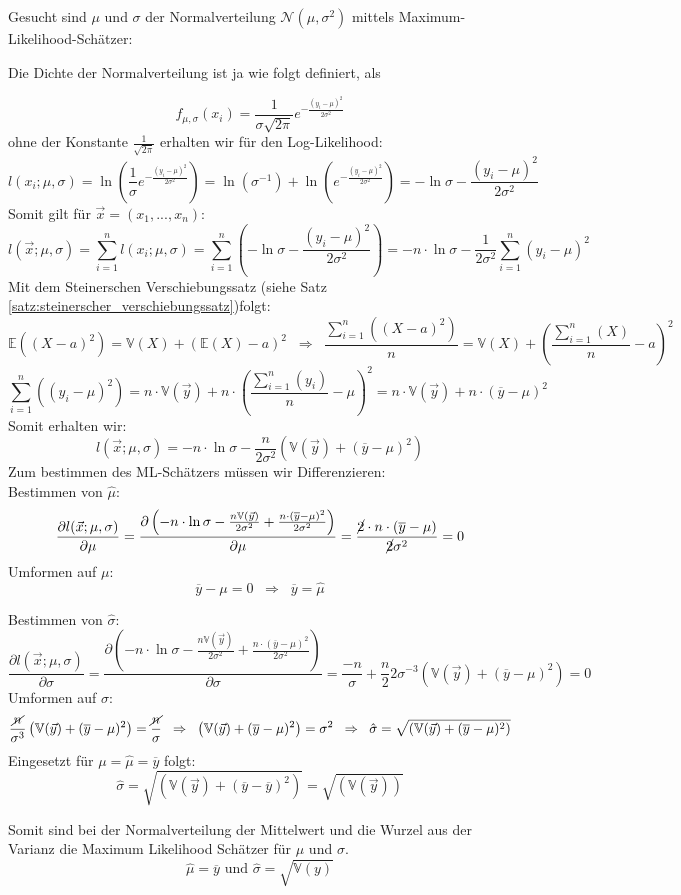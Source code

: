 \begin{bsp}\label{bsp:ml_normalverteilung}
    Gesucht sind $\mu$ und $\sigma$ der Normalverteilung $\mathcal N(\mu, \sigma^2)$ mittels Maximum-Likelihood-Schätzer: 

    Die Dichte der Normalverteilung ist ja wie folgt definiert, als 
    
    \[f_{\mu,\sigma}(x_i)=\frac{1}{\sigma\sqrt{2\pi}}e^{-\frac{(y_i-\mu)^2}{2\sigma^2}}\]
    ohne der Konstante $\frac{1}{\sqrt{2\pi}}$ erhalten wir für den Log-Likelihood:
    \[l(x_i;\mu, \sigma)=\ln\left(\frac{1}{\sigma}e^{-\frac{(y_i-\mu)^2}{2\sigma^2}}\right)=
    \ln\left(\sigma^{-1}\right)+\ln\left(e^{-\frac{(y_i-\mu)^2}{2\sigma^2}}\right)=
    -\ln\sigma-\frac{(y_i-\mu)^2}{2\sigma^2}\]
    Somit gilt für $\vec x=(x_1, ..., x_n)$:
    \[l(\vec x;\mu, \sigma)=\sum_{i=1}^nl(x_i;\mu,\sigma)=
    \sum_{i=1}^n\left(-\ln\sigma-\frac{(y_i-\mu)^2}{2\sigma^2}\right)=
    -n\cdot \ln\sigma-\frac{1}{2\sigma^2}\sum_{i=1}^n(y_i-\mu)^2
    \]
    Mit dem Steinerschen Verschiebungssatz (siehe Satz \ref{satz:steinerscher_verschiebungssatz})folgt:
    \[\mathbb E((X-a)^2)=\mathbb V(X)+(\mathbb E(X)-a)^2\;\;\Rightarrow\;\;\frac{\sum_{i=1}^n((X-a)^2)}{n}=\mathbb V(X)+(\frac{\sum_{i=1}^n(X)}{n}-a)^2\]
    \[{\sum_{i=1}^n((y_i-\mu)^2)}=n\cdot\mathbb V(\vec y)+n\cdot(\frac{\sum_{i=1}^n(y_i)}{n}-\mu)^2=
    n\cdot\mathbb V(\vec y)+n\cdot(\overline y-\mu)^2
    \]
    Somit erhalten wir: 
    \[l(\vec x;\mu, \sigma)=
    -n\cdot \ln\sigma-\frac{n}{2\sigma^2}\left(\mathbb V(\vec y)+(\overline y-\mu)^2\right)
    \]
    Zum bestimmen des ML-Schätzers müssen wir Differenzieren:\\
    Bestimmen von $\hat\mu$:
    \[\frac{\partial l(\vec x;\mu, \sigma)}{\partial \mu}=
    \frac{\partial \left(-n\cdot \ln\sigma-\frac{n\mathbb{V}(\vec y)}{2\sigma^2}+\frac{n\cdot(\overline y-\mu)^2}{2\sigma^2}\right)}{\partial \mu}=
    \frac{\cancel2\cdot n\cdot(\overline y-\mu)}{\cancel 2\sigma^2}=0
    \]
    Umformen auf $\mu$:
    \[\overline y-\mu=0\;\;\Rightarrow\;\;\overline y=\hat\mu\]

    Bestimmen von $\hat\sigma$:
    \[\frac{\partial l(\vec x;\mu, \sigma)}{\partial \sigma}=
    \frac{\partial \left(-n\cdot \ln\sigma-\frac{n\mathbb{V}(\vec y)}{2\sigma^2}+\frac{n\cdot(\overline y-\mu)^2}{2\sigma^2}\right)}{\partial \sigma}=\frac{-n}{\sigma}+\frac{n}{2}2\sigma^{-3}\left(\mathbb V(\vec y)+(\overline y-\mu)^2\right)
    =0\]
    Umformen auf $\sigma$:
    \[\frac{\cancel n}{\sigma^3}\left(\mathbb V(\vec y)+(\overline y-\mu)^2\right)
    =\frac{\cancel n}{\sigma}\;\;\Rightarrow\;\;
    \left(\mathbb V(\vec y)+(\overline y-\mu)^2\right)
    =\sigma^2\;\;\Rightarrow\;\;
    \hat\sigma=\sqrt{\left(\mathbb V(\vec y)+(\overline y-\mu)^2\right)}\]
    Eingesetzt für $\mu=\hat\mu=\overline y$ folgt:
    \[
    \hat\sigma=\sqrt{\left(\mathbb V(\vec y)+(\overline y-\overline y)^2\right)}=\sqrt{\left(\mathbb V(\vec y)\right)}\]

    Somit sind bei der Normalverteilung der Mittelwert und die Wurzel aus der Varianz die Maximum Likelihood Schätzer für $\mu$ und $\sigma$.
    \[\hat \mu=\overline y\text{ und }\hat \sigma=\sqrt{\mathbb{V}(y)}\]
\end{bsp}

